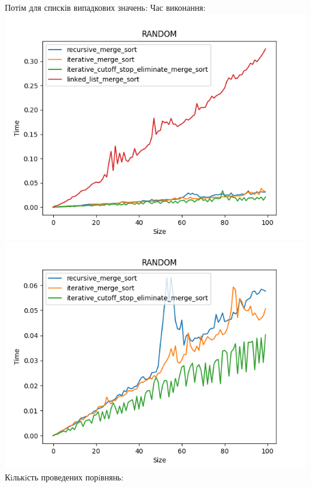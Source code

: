 \documentclass{article}
\begin{document}
        \newpage
        \indent \indent Потім для списків випадкових значень:
        \newline
        \indent \indent \indent Час виконання:
        \newline
            \includegraphics[scale=0.5]{random_Time_4_sorts.png}
            \includegraphics[scale=0.5]{random_Time_3_sorts.png}
        \newline
        \indent \indent \indent Кiлькiсть проведених порiвнянь:
        \newline
\end{document}
